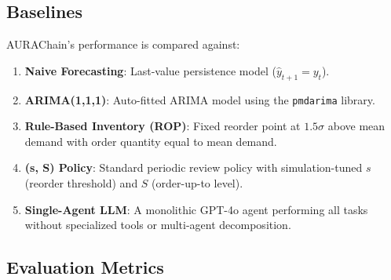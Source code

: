 \documentclass[conference]{IEEEtran}
\begin{document}
\subsection{Baselines}

AURAChain's performance is compared against:

\begin{enumerate}
    \item \textbf{Naive Forecasting}: Last-value persistence model ($\hat{y}_{t+1} = y_t$).
    \item \textbf{ARIMA(1,1,1)}: Auto-fitted ARIMA model using the \texttt{pmdarima} library.
    \item \textbf{Rule-Based Inventory (ROP)}: Fixed reorder point at $1.5\sigma$ above mean demand with order quantity equal to mean demand.
    \item \textbf{(s, S) Policy}: Standard periodic review policy with simulation-tuned $s$ (reorder threshold) and $S$ (order-up-to level).
    \item \textbf{Single-Agent LLM}: A monolithic GPT-4o agent performing all tasks without specialized tools or multi-agent decomposition.
\end{enumerate}

\subsection{Evaluation Metrics}
\end{document}
